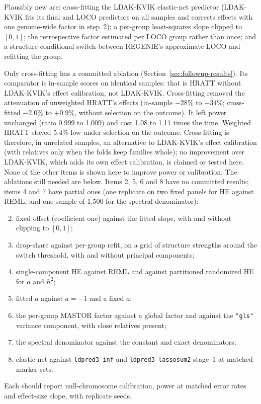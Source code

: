 \documentclass[11pt]{article}
\newcommand{\code}[1]{\texttt{#1}}
\begin{document}
Plausibly new are: cross-fitting the LDAK-KVIK elastic-net predictor
(LDAK-KVIK fits its final and LOCO predictors on all samples and corrects
effects with one genome-wide factor in step~2); a per-group least-squares
slope clipped to $[0,1]$; the retrospective factor estimated per LOCO group
rather than once; and a structure-conditional switch between REGENIE's
approximate LOCO and refitting the group.

Only cross-fitting has a committed ablation
(Section~\ref{sec:followup-results}). Its comparator is in-sample scores
on identical samples: that is HRATT without LDAK-KVIK's effect
calibration, not LDAK-KVIK. Cross-fitting removed the attenuation of
unweighted HRATT's effects (in-sample $-28\%$ to $-34\%$; cross-fitted
$-2.0\%$ to $+0.9\%$, without selection on the outcome). It left power
unchanged (ratio 0.999 to 1.009) and cost 1.08 to 1.11 times the time.
Weighted HRATT stayed $5.4\%$ low under selection on the outcome.
Cross-fitting is therefore, in unrelated samples, an alternative to
LDAK-KVIK's effect calibration (with relatives only when the folds keep
families whole); no improvement over LDAK-KVIK, which
adds its own effect calibration, is claimed or tested here. None of the
other items is shown here to improve power or calibration. The ablations
still needed are below. Items 2, 5, 6 and 8 have no committed results;
items 4 and 7 have partial ones (one replicate on two fixed panels for HE
against REML, and one sample of 1,500 for the spectral denominator):
\begin{enumerate}
 \setcounter{enumi}{1}
 \item fixed offset (coefficient one) against the fitted slope, with and
 without clipping to $[0,1]$;
 \item drop-share against per-group refit, on a grid of structure strengths
 around the switch threshold, with and without principal components;
 \item single-component HE against REML and against partitioned randomized
 HE for $a$ and $h^2$;
 \item fitted $a$ against $a=-1$ and a fixed $a$;
 \item the per-group MASTOR factor against a global factor and against the
 \code{"gls"} variance component, with close relatives present;
 \item the spectral denominator against the constant and exact
 denominators;
 \item elastic-net against \code{ldpred3-inf} and \code{ldpred3-lassosum2}
 stage~1 at matched marker sets.
\end{enumerate}
Each should report null-chromosome calibration, power at matched error
rates and effect-size slope, with replicate seeds.
\end{document}
